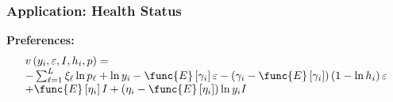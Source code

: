 \begin{frame}[allowframebreaks]%
\frametitle{Application: Health Status}
\textbf{Preferences:}
\begin{equation}
\begin{array}{l}
v\left( y_{i},\varepsilon ,I,h_{i},p\right) = \\
-\sum_{\ell =1}^{L}\xi _{\ell }\ln p_{\ell }+\ln y_{i}-\func{E}\left[ \gamma
_{i}\right] \varepsilon -\left( \gamma _{i}-\func{E}\left[ \gamma _{i}\right]
\right) \left( 1-\ln h_{i}\right) \varepsilon  \\
+\func{E}\left[ \eta _{i}\right] I+\left( \eta _{i}-\func{E}\left[ \eta _{i}%
\right] \right) \ln y_{i}I%
\end{array}
\end{equation}%

\end{frame}%
%

